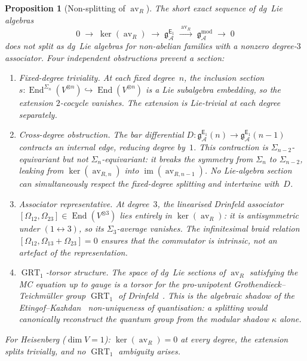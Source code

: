\documentclass[11pt,reqno]{amsart}
\newtheorem{proposition}[theorem]{Proposition}
\theoremstyle{definition}
\theoremstyle{remark}
\newcommand{\cA}{\mathcal{A}}
\newcommand{\Eone}{\mathsf{E}_{1}}
\DeclareMathOperator{\End}{End}
\DeclareMathOperator{\av}{av}
\DeclareMathOperator{\GRT}{GRT}
\newcommand{\gmod}{\mathfrak{g}^{\mathrm{mod}}_{\cA}}
\newcommand{\gEone}{\mathfrak{g}^{\Eone}_{\cA}}
\numberwithin{equation}{section}
\begin{document}
\begin{proposition}[Non-splitting of $\av_R$]
\label{prop:nonsplitting}
The short exact sequence of dg~Lie algebras
\begin{equation}\label{eq:nonsplitting-ses}
  0 \;\longrightarrow\; \ker(\av_R) \;\longrightarrow\;
  \gEone \;\xrightarrow{\;\av_R\;}\; \gmod
  \;\longrightarrow\; 0
\end{equation}
does not split as dg~Lie algebras for non-abelian families with a
nonzero degree-$3$ associator. Four independent obstructions prevent
a section:
\begin{enumerate}[label=\textup{(\roman*)}]
\item \emph{Fixed-degree triviality.}
  At each fixed degree~$n$, the inclusion section
  $s\colon \End^{\Sigma_n}(V^{\otimes n})
  \hookrightarrow \End(V^{\otimes n})$
  is a Lie subalgebra embedding, so the extension $2$-cocycle
  vanishes. The extension is Lie-trivial at each degree separately.

\item \emph{Cross-degree obstruction.}
  The bar differential
  $D\colon \gEone(n) \to \gEone(n{-}1)$
  contracts an internal edge, reducing degree by~$1$. This
  contraction is $\Sigma_{n-2}$-equivariant but
  \emph{not} $\Sigma_n$-equivariant: it breaks the symmetry from
  $\Sigma_n$ to $\Sigma_{n-2}$, leaking from
  $\ker(\av_{R,n})$ into $\operatorname{im}(\av_{R,n-1})$. No
  Lie-algebra section can simultaneously respect the fixed-degree
  splitting and intertwine with~$D$.

\item \emph{Associator representative.}
  At degree~$3$, the linearised Drinfeld associator
  $[\Omega_{12}, \Omega_{23}] \in \End(V^{\otimes 3})$ lies
  entirely in $\ker(\av_R)$: it is antisymmetric under
  $(1 \leftrightarrow 3)$, so its $\Sigma_3$-average vanishes.
  The infinitesimal braid relation
  $[\Omega_{12}, \Omega_{13} + \Omega_{23}] = 0$
  ensures that the commutator is intrinsic, not an artefact
  of the representation.

\item \emph{$\GRT_1$-torsor structure.}
  The space of dg~Lie sections of $\av_R$ satisfying the MC equation
  up to gauge is a torsor for the pro-unipotent
  Grothendieck--Teichm\"uller group $\GRT_1$ of
  Drinfeld~\cite{Drinfeld91}. This is the algebraic shadow of the
  Etingof--Kazhdan~\cite{EK96} non-uniqueness of quantisation: a
  splitting would canonically reconstruct the quantum group from the
  modular shadow $\kappa$ alone.
\end{enumerate}
For Heisenberg ($\dim V = 1$): $\ker(\av_R) = 0$ at every degree,
the extension splits trivially, and no $\GRT_1$ ambiguity arises.
\end{proposition}
\end{document}
